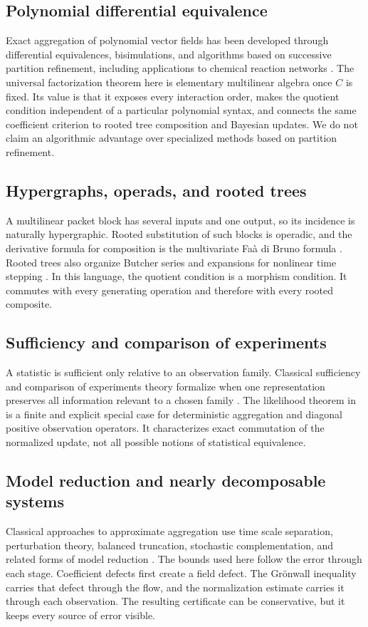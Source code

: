 \documentclass[11pt]{article}
\theoremstyle{definition}
\theoremstyle{remark}
\begin{document}
\subsection{Polynomial differential equivalence}
Exact aggregation of polynomial vector fields has been developed through differential equivalences, bisimulations, and algorithms based on successive partition refinement, including applications to chemical reaction networks \cite{Cardelli2015,Cardelli2017}.  The universal factorization theorem here is elementary multilinear algebra once $C$ is fixed.  Its value is that it exposes every interaction order, makes the quotient condition independent of a particular polynomial syntax, and connects the same coefficient criterion to rooted tree composition and Bayesian updates.  We do not claim an algorithmic advantage over specialized methods based on partition refinement.

\subsection{Hypergraphs, operads, and rooted trees}
A multilinear packet block has several inputs and one output, so its incidence is naturally hypergraphic.  Rooted substitution of such blocks is operadic, and the derivative formula for composition is the multivariate Fa\`a di Bruno formula \cite{ConstantineSavits1996}.  Rooted trees also organize Butcher series and expansions for nonlinear time stepping \cite{Butcher1972,HairerLubichWanner2006}.  In this language, the quotient condition is a morphism condition.  It commutes with every generating operation and therefore with every rooted composite.

\subsection{Sufficiency and comparison of experiments}
A statistic is sufficient only relative to an observation family.  Classical sufficiency and comparison of experiments theory formalize when one representation preserves all information relevant to a chosen family \cite{HalmosSavage1949,Blackwell1953}.  The likelihood theorem in  is a finite and explicit special case for deterministic aggregation and diagonal positive observation operators.  It characterizes exact commutation of the normalized update, not all possible notions of statistical equivalence.

\subsection{Model reduction and nearly decomposable systems}
Classical approaches to approximate aggregation use time scale separation, perturbation theory, balanced truncation, stochastic complementation, and related forms of model reduction \cite{SimonAndo1961,Meyer1989,Antoulas2005}.  The bounds used here follow the error through each stage.  Coefficient defects first create a field defect.  The Grönwall inequality carries that defect through the flow, and the normalization estimate carries it through each observation.  The resulting certificate can be conservative, but it keeps every source of error visible.
\end{document}
